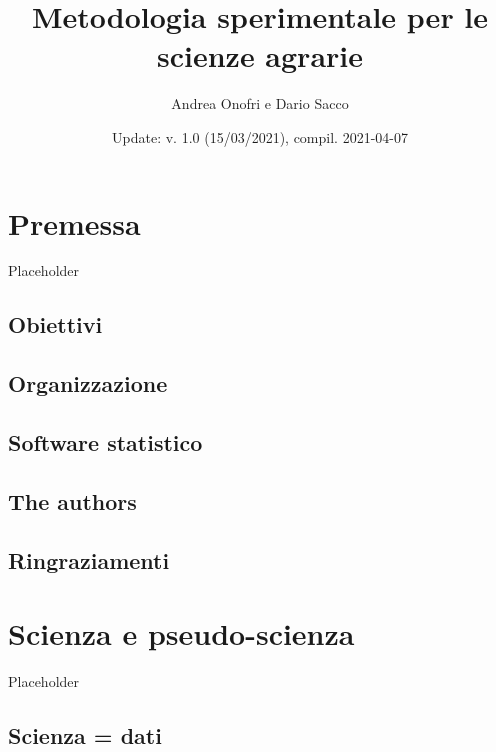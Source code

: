 \documentclass[a4paper,12pt,oneside]{book}
\author{Andrea Onofri e Dario Sacco}
\date{Update: v. 1.0 (15/03/2021), compil. 2021-04-07}
\title{Metodologia sperimentale per le scienze agrarie}
\subtitle{}
\begin{document}
\maketitle
\tableofcontents

\hypertarget{premessa}{%
\chapter*{Premessa}\label{premessa}}

Placeholder

\hypertarget{obiettivi}{%
\section*{Obiettivi}\label{obiettivi}}

\hypertarget{organizzazione}{%
\section*{Organizzazione}\label{organizzazione}}

\hypertarget{software-statistico}{%
\section*{Software statistico}\label{software-statistico}}

\hypertarget{the-authors}{%
\section*{The authors}\label{the-authors}}

\hypertarget{ringraziamenti}{%
\section*{Ringraziamenti}\label{ringraziamenti}}

\hypertarget{scienza-e-pseudo-scienza}{%
\chapter{Scienza e pseudo-scienza}\label{scienza-e-pseudo-scienza}}

Placeholder

\hypertarget{scienza-dati}{%
\section{Scienza = dati}\label{scienza-dati}}
\end{document}
